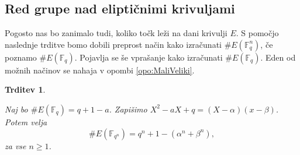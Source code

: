 \documentclass[12pt,a4paper,twoside]{article}
\theoremstyle{definition} %
\theoremstyle{plain} %
\newtheorem{trditev}[definicija]{Trditev}
\numberwithin{equation}{section}  %
\newcommand{\F}{\mathbb F}
\newcommand{\E}[1]{E({#1})}
\begin{document}
\subsection{Red grupe nad eliptičnimi krivuljami}


Pogosto nas bo zanimalo tudi, koliko točk leži na dani krivulji $E$. S pomočjo naslednje trditve bomo dobili preprost način kako izračunati $\# \E{\F_q^n}$, če poznamo $\# \E{\F_q}$.
Pojavlja se še vprašanje kako izračunati $\# \E{\F_q}$. Eden od možnih načinov se nahaja v opombi \ref{opo:MaliVeliki}.




\begin{trditev}~

\label{trd:4.12}

Naj bo $\# \E{\F_q} = q+1-a$. Zapišimo $X^2-aX+q = (X-\alpha)(x-\beta)$. Potem velja
$$\# \E{\F_{q^{n}}} = q^n+1-(\alpha^n+\beta^n),$$
za vse $n \geq 1$.

\end{trditev}
\end{document}

